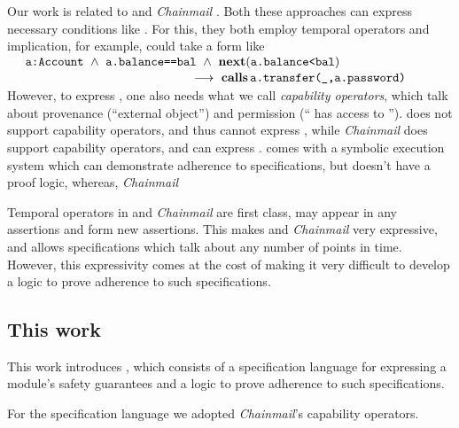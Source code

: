 {Our work is related} to  {} \cite{VerX} and  \emph{Chainmail} \cite{FASE}.
Both these approaches can express necessary conditions
  like \SrobustA. For this, they  {both employ
  temporal operators and implication, for example,  \SrobustA
 could take a form like} 
\\
 $\strut ~  ~ \hspace{.1in} \strut  \prg{a:Account} \ \wedge\ \prg{a.balance==bal}  \ \wedge\ \textbf{next}(\prg{a.balance<bal}) $\\
 $\strut ~ \hspace{2in} \strut \strut \strut \longrightarrow\    \textbf{calls}\, {\texttt{a.transfer(\_,a.password)}}$
 \\
 { However, to express \SrobustB, one also needs what we call \emph{capability operators}, which talk about 
 provenance (``external object'') and
  permission (`` has access to ''). 
   {}  does not support capability operators, and thus cannot express   \SrobustB, 
   while  \emph{Chainmail} does support capability operators, and can express  \SrobustB. 
}  
 {} comes with a symbolic 
  execution system which can demonstrate adherence to  specifications, but doesn't have a proof logic, %
   whereas, \emph{Chainmail}  
  
 {Temporal operators in {}   and  \emph{Chainmail}  are first class, \ie may appear in any assertions 
and form new assertions. This makes {}   and  \emph{Chainmail} very expressive,
and allows specifications which talk about any number of points in time.
However, this expressivity comes at the cost of making it very difficult to develop a logic to
prove adherence to such specifications.}
  
\vspace{.04in}

\subsection{This work}
\label{intro:this:work}
This work introduces \Nec, which consists of a specification language for expressing a module's safety guarantees 
and a logic 
to prove adherence to such specifications.

For the specification language we adopted %
\emph{Chainmail}'s %
  capability operators.
  

